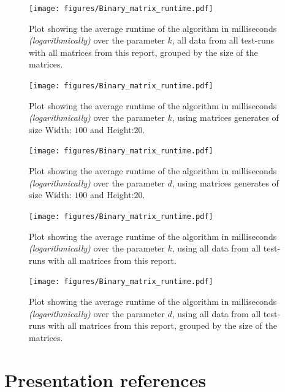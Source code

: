 \documentclass{beamer}
\begin{document}
\begin{frame}
  \begin{figure}
    \centering
    \texttt{[image: figures/Binary\_matrix\_runtime.pdf]}
    \caption{Plot showing the average runtime of the algorithm in milliseconds \textit{(logarithmically)}
      over the parameter $k$, all data from all test-runs with all matrices from this report, grouped by
      the size of the matrices.}
  \end{figure}
\end{frame}

\begin{frame}
  \begin{figure}
    \centering
    \texttt{[image: figures/Binary\_matrix\_runtime.pdf]}
    \caption{Plot showing the average runtime of the algorithm in milliseconds \textit{(logarithmically)}
      over the parameter $k$, using matrices generates of size Width: $100$ and Height:$20$.}
  \end{figure}
\end{frame}

\begin{frame}
  \begin{figure}
    \centering
    \texttt{[image: figures/Binary\_matrix\_runtime.pdf]}
    \caption{Plot showing the average runtime of the algorithm in milliseconds \textit{(logarithmically)}
      over the parameter $d$, using matrices generates of size Width: $100$ and Height:$20$.}
  \end{figure}
\end{frame}

\begin{frame}
  \begin{figure}
    \centering
    \texttt{[image: figures/Binary\_matrix\_runtime.pdf]}
    \caption{Plot showing the average runtime of the algorithm in milliseconds \textit{(logarithmically)}
      over the parameter $k$, using all data from all test-runs with all matrices from this report.}
  \end{figure}
\end{frame}

\begin{frame}
  \begin{figure}
    \centering
    \texttt{[image: figures/Binary\_matrix\_runtime.pdf]}
    \caption{Plot showing the average runtime of the algorithm in milliseconds \textit{(logarithmically)}
      over the parameter $d$, using all data from all test-runs with all matrices from this report, grouped by
      the size of the matrices.}
  \end{figure}
\end{frame}

\section{Presentation references}

\end{document}
